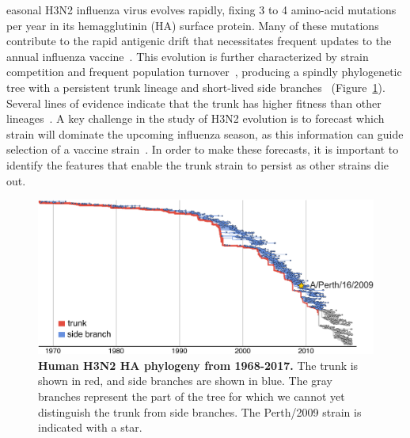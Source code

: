 \documentclass[9pt,twocolumn,twoside]{pnas-new}
\begin{document}
easonal H3N2 influenza virus evolves rapidly, fixing 3 to 4 amino-acid mutations per year in its hemagglutinin (HA) surface protein.
 Many of these mutations contribute to the rapid antigenic drift that necessitates frequent updates to the annual influenza vaccine~\cite{smith2004mapping,bhatt2011genomic}.
This evolution is further characterized by strain competition and frequent population turnover~\cite{fitch1997long,strelkowa2012clonal,bedford2011,neher2014predicting,koelle2015effects,bedford2015global}, producing a spindly phylogenetic tree with a persistent trunk lineage and short-lived side branches~\cite{fitch1991positive} (Figure~\ref{fig:H3N2_phylogeny}).
Several lines of evidence indicate that the trunk has higher fitness than other lineages~\cite{strelkowa2012clonal,bedford2011,neher2014predicting,koelle2015effects}.
A key challenge in the study of H3N2 evolution is to forecast which strain will dominate the upcoming influenza season, as this information can guide selection of a vaccine strain~\cite{morris2017predictive}.
In order to make these forecasts, it is important to identify the features that enable the trunk strain to persist as other strains die out.

\begin{figure}
\centering
\includegraphics[width=\linewidth]{figs/H3N2_phylogeny/H3N2_phylogeny.pdf}
\caption{\label{fig:H3N2_phylogeny}
{\bf Human H3N2 HA phylogeny from 1968-2017.}
The trunk is shown in red, and side branches are shown in blue.
The gray branches represent the part of the tree for which we cannot yet distinguish the trunk from side branches.
The Perth/2009 strain is indicated with a star.
}
\end{figure}
\end{document}
